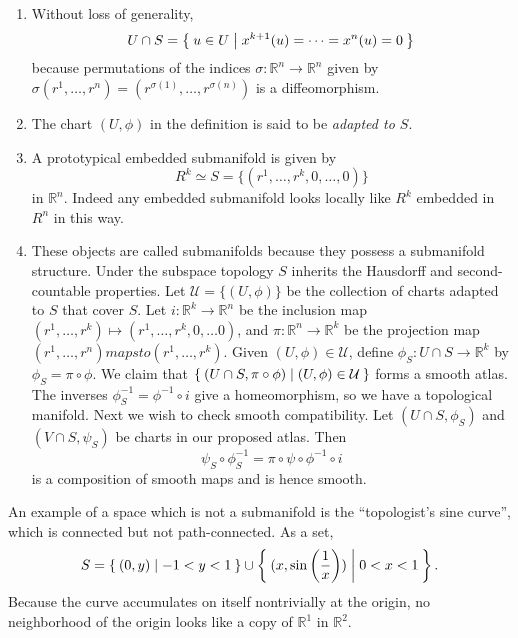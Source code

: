 \begin{remark}
  \begin{enumerate}
    \item{
      Without loss of generality,
      $$
      U \cap S = \Set{ u \in U | x^{k+1}(u) = \cdots = x^n(u) = 0 }
      $$
      because permutations of the indices
      $\sigma: \mathbb{R}^n \to \mathbb{R}^n$ given by
      $\sigma(r^1, \dots, r^n) = (r^{\sigma(1)}, \dots,
      r^{\sigma(n)})$ is a diffeomorphism.
    }
    \item{
      The chart $(U, \phi)$ in the definition is said to be
      \emph{adapted to $S$}.
    }
    \item{
      A prototypical embedded submanifold is given by
      $$
      R^k \simeq S = \{ (r^1, \dots, r^k, 0, \dots, 0) \}
      $$
      in $\mathbb{R}^n$. Indeed any embedded submanifold looks locally
      like $R^k$ embedded in $R^n$ in this way.
    }
    \item{
      These objects are called submanifolds because they possess a
      submanifold structure.
      Under the subspace topology $S$ inherits the Hausdorff and
      second-countable properties.
      Let $\mathcal{U} = \{ (U, \phi) \}$ be the collection of charts
      adapted to $S$ that cover $S$. Let $i: \mathbb{R}^k \to
      \mathbb{R}^n$ be the inclusion map
      $(r^1, \dots, r^k) \mapsto (r^1, \dots, r^k, 0, \dots 0)$, and
      $\pi: \mathbb{R}^n \to \mathbb{R}^k$ be the projection map
      $(r^1, \dots, r^n) mapsto (r^1, \dots, r^k)$. Given
      $(U, \phi) \in \mathcal{U}$, define
      $\phi_S : U \cap S \to \mathbb{R}^k$ by $\phi_S = \pi \circ
      \phi$. We claim that
      $\Set{ (U \cap S, \pi \circ \phi) | (U, \phi) \in \mathcal{U}
      }$ forms a smooth atlas. The inverses
      $\phi_S^{-1} = \phi^{-1} \circ i$ give a homeomorphism, so we
      have a topological manifold. Next we wish to check smooth
      compatibility. Let $(U \cap S, \phi_S)$ and $(V \cap S, \psi_S)$
      be charts in our proposed atlas. Then
      $$
      \psi_S \circ \phi_S^{-1} = \pi \circ \psi \circ \phi^{-1} \circ i
      $$
      is a composition of smooth maps and is hence smooth.
    }
  \end{enumerate}
\end{remark}

\begin{xmpl}
An example of a space which is not a submanifold is the ``topologist's
sine curve'', which is connected but not path-connected. As a set,
$$
S = \Set{ (0, y) | -1 < y < 1 }
\cup \Set{ (x, \sin\left(\frac{1}{x}\right)) | 0 < x < 1 }.
$$
Because the curve accumulates on itself nontrivially at the origin, no
neighborhood of the origin looks like a copy of $\mathbb{R}^1$ in $\mathbb{R}^2$.
\end{xmpl}


